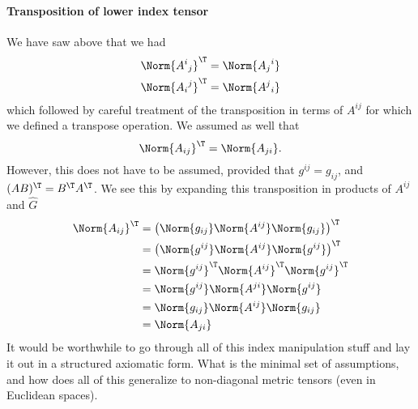 %
%
%
%
%
\paragraph{Transposition of lower index tensor}
%
We have saw above that we had
%
\begin{equation}\label{eqn:relativisticElectrodynamicsL11:1022}
\begin{aligned}
\Norm{ {A^{i}}_j }^\T &= \Norm{ {A_{j}}^i } \\
\Norm{ {A_{i}}^j }^\T &= \Norm{ {A^{j}}_i }
\end{aligned}
\end{equation}
%
which followed by careful treatment of the transposition in terms of \(A^{i j}\) for which we defined a transpose operation.  We assumed as well that
%
\begin{equation}\label{eqn:relativisticElectrodynamicsL11:1042}
\Norm{ A_{i j} }^\T = \Norm{ A_{j i} }.
\end{equation}
%
However, this does not have to be assumed, provided that \(g^{i j} = g_{i j}\), and \((AB)^\T = B^\T A^\T\).  We see this by expanding this transposition in products of \(A^{i j}\) and \(\hat{G}\)
%
\begin{equation}\label{eqn:relativisticElectrodynamicsL11b:1480}
\begin{aligned}
\Norm{ A_{i j} }^\T
&= \left( \Norm{g_{i j}} \Norm{ A^{i j} } \Norm{g_{i j}} \right)^\T \\
&= \left( \Norm{g^{i j}} \Norm{ A^{i j} } \Norm{g^{i j}} \right)^\T \\
&= \Norm{g^{i j}}^\T \Norm{ A^{i j}}^\T \Norm{g^{i j}}^\T \\
&= \Norm{g^{i j}} \Norm{ A^{j i}} \Norm{g^{i j}} \\
&= \Norm{g_{i j}} \Norm{ A^{i j}} \Norm{g_{i j}} \\
&= \Norm{ A_{j i}}
\end{aligned}
\end{equation}
%
It would be worthwhile to go through all of this index manipulation stuff and lay it out in a structured axiomatic form.  What is the minimal set of assumptions, and how does all of this generalize to non-diagonal metric tensors (even in Euclidean spaces).
%
